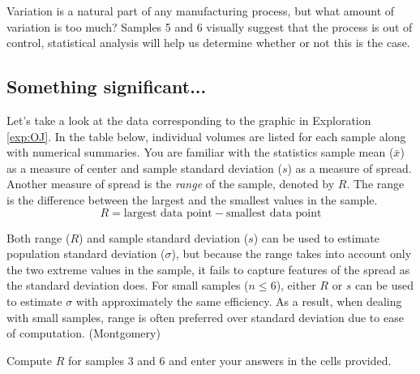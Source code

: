 \documentclass{ximera}
\begin{document}
Variation is a natural part of any manufacturing process, but what amount of variation is too much?  Samples 5 and 6 visually suggest that the process is out of control, statistical analysis will help us determine whether or not this is the case. 






\subsection*{Something significant...}
Let's take a look at the data corresponding to the graphic in Exploration \ref{exp:OJ}.  In the table below, individual volumes are listed for each sample along with numerical summaries.  You are familiar with the statistics sample mean ($\bar{x}$) as a measure of center and sample standard deviation ($s$) as a measure of spread.  Another measure of spread is the  \emph{range} of the sample, denoted by $R$.  The range is the difference between the largest and the smallest values in the sample.  
$$R=\text{largest data point}-\text{smallest data point}$$

Both range ($R$) and sample standard deviation ($s$) can be used to estimate population standard deviation ($\sigma$), but because the range takes into account only the two extreme values in the sample, it fails to capture features of the spread as the standard deviation does.  For small samples ($n\leq 6$), either $R$ or $s$ can be used to estimate $\sigma$ with approximately the same efficiency.  As a result, when dealing with small samples, range is often preferred over standard deviation due to ease of computation. (Montgomery)

Compute $R$ for samples 3 and 6 and enter your answers in the cells provided.
\end{document}
